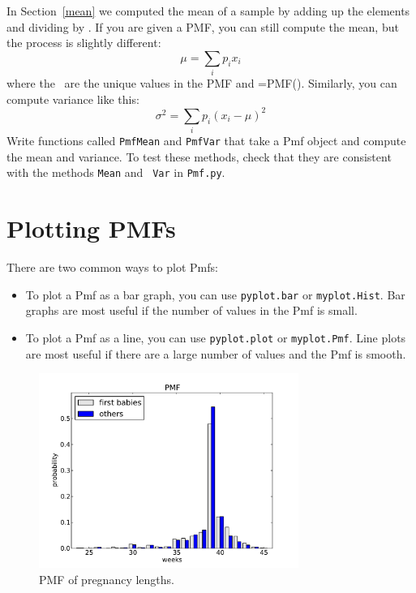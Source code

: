 \documentclass[12pt]{book}
\begin{document}
\begin{exercise}
%
%
In Section~\ref{mean} we computed the mean of a sample by adding up
the elements and dividing by \n.  If you are given a PMF, you can
still compute the mean, but the process is slightly different:
%
\[ \mu = \sum_i p_i x_i \]
%
where the \xsubi~are the unique values in the PMF and \psubi=PMF(\xsubi).
Similarly, you can compute variance like this:
%
\[ \sigma^2 = \sum_i p_i (x_i - \mu)^2\]
% 
Write functions called {\tt PmfMean} and {\tt PmfVar} that take a
Pmf object and compute the mean and variance.  To test these methods,
check that they are consistent with the methods {\tt Mean} and {\tt
  Var} in {\tt Pmf.py}.

\end{exercise}




\section{Plotting PMFs}

There are two common ways to plot Pmfs:

\begin{itemize}

\item To plot a Pmf as a bar graph, you can use {\tt pyplot.bar}
or {\tt myplot.Hist}.  Bar graphs are most useful if the number
of values in the Pmf is small.

\item To plot a Pmf as a line, you can use {\tt pyplot.plot}
or {\tt myplot.Pmf}.  Line plots are most useful if there are
a large number of values and the Pmf is smooth.

\end{itemize}

\begin{figure}
\centerline{\includegraphics[height=2.5in]{figs/nsfg_pmf.pdf}}
\caption{PMF of pregnancy lengths.}
\label{nsfg_pmf}
\end{figure}
\end{document}
